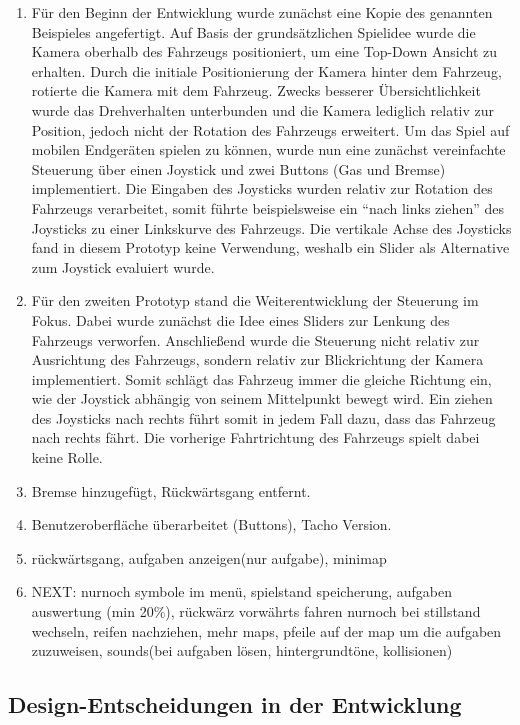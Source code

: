 	\begin{enumerate}[label=Prototyp \arabic*]
		\item{Für den Beginn der Entwicklung wurde zunächst eine Kopie des genannten Beispieles angefertigt. Auf Basis der grundsätzlichen Spielidee wurde die Kamera oberhalb des Fahrzeugs positioniert, um eine Top-Down Ansicht zu erhalten. Durch die initiale Positionierung der Kamera hinter dem Fahrzeug, rotierte die Kamera mit dem Fahrzeug. Zwecks besserer Übersichtlichkeit wurde das Drehverhalten unterbunden und die Kamera lediglich relativ zur Position, jedoch nicht der Rotation des Fahrzeugs erweitert. Um das Spiel auf mobilen Endgeräten spielen zu können, wurde nun eine zunächst vereinfachte Steuerung über einen Joystick und zwei Buttons (Gas und Bremse) implementiert. Die Eingaben des Joysticks wurden relativ zur Rotation des Fahrzeugs verarbeitet, somit führte beispielsweise ein \enquote{nach links ziehen} des Joysticks zu einer Linkskurve des Fahrzeugs. Die vertikale Achse des Joysticks fand in diesem Prototyp keine Verwendung, weshalb ein Slider als Alternative zum Joystick evaluiert wurde. }
		\item{Für den zweiten Prototyp stand die Weiterentwicklung der Steuerung im Fokus. Dabei wurde zunächst die Idee eines Sliders zur Lenkung des Fahrzeugs verworfen. Anschließend wurde die Steuerung nicht relativ zur Ausrichtung des Fahrzeugs, sondern relativ zur Blickrichtung der Kamera implementiert. Somit schlägt das Fahrzeug immer die gleiche Richtung ein, wie der Joystick abhängig von seinem Mittelpunkt bewegt wird. Ein ziehen des Joysticks nach rechts führt somit in jedem Fall dazu, dass das Fahrzeug nach rechts fährt. Die vorherige Fahrtrichtung des Fahrzeugs spielt dabei keine Rolle. }
		\item{ Bremse hinzugefügt, Rückwärtsgang entfernt. }
		\item{ Benutzeroberfläche überarbeitet (Buttons), Tacho Version. }
		\item{ rückwärtsgang, aufgaben anzeigen(nur aufgabe), minimap }
		\item{NEXT: nurnoch symbole im menü, spielstand speicherung, aufgaben auswertung (min 20\%), rückwärz vorwährts fahren nurnoch bei stillstand wechseln, reifen nachziehen, mehr maps, pfeile auf der map um die aufgaben zuzuweisen, sounds(bei aufgaben lösen, hintergrundtöne, kollisionen) }
	\end{enumerate}
\subsection{Design-Entscheidungen in der Entwicklung}
